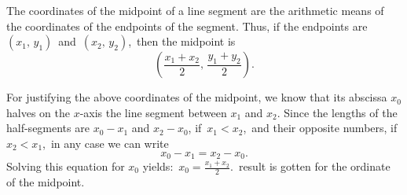 \documentclass[12pt]{article}
\theoremstyle{definition}
\begin{document}
The coordinates of the midpoint of a line segment are the arithmetic means of the coordinates of the endpoints of the segment.  Thus, if the endpoints are\, $(x_1,\,y_1)$\, and\, $(x_2,\,y_2)$,\, then the midpoint is
   $$\left(\frac{x_1\!+\!x_2}{2},\, \frac{y_1\!+\!y_2}{2}\right)\!.$$

For justifying the above coordinates of the midpoint, we know that its abscissa $x_0$ halves on the $x$-axis the line segment between $x_1$ and $x_2$.  Since the lengths of the half-segments are $x_0\!-\!x_1$ and $x_2\!-\!x_0$, if\, 
$x_1 < x_2$,\, and their opposite numbers, if\, $x_2 < x_1$,\, in any case we can write
$$x_0-x_1 = x_2-x_0.$$
Solving this equation for $x_0$ yields:\, $\displaystyle x_0 = \frac{x_1\!+\!x_2}{2}$.\,  result is gotten for the ordinate of the midpoint.
\end{document}
